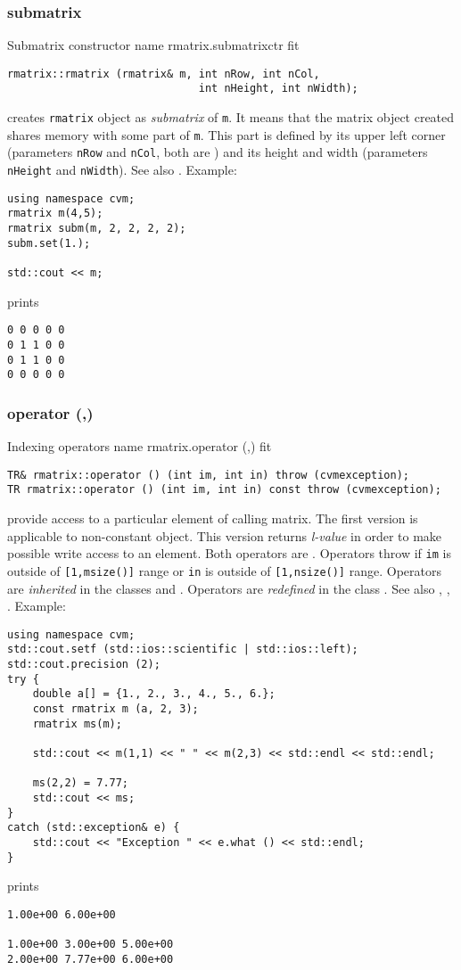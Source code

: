 \subsubsection{submatrix}
Submatrix constructor%
\pdfdest name {rmatrix.submatrixctr} fit
\begin{verbatim}
rmatrix::rmatrix (rmatrix& m, int nRow, int nCol,
                              int nHeight, int nWidth);
\end{verbatim}
creates  \verb"rmatrix" object as  \emph{submatrix} of \verb"m".
It means that the matrix object created shares  memory with some part
of \verb"m". This part is defined by its upper left corner (parameters
\verb"nRow" and \verb"nCol", both are \Based)
and its height and width (parameters
\verb"nHeight" and \verb"nWidth").
See also .
Example:
\begin{Verbatim}
using namespace cvm;
rmatrix m(4,5);
rmatrix subm(m, 2, 2, 2, 2);
subm.set(1.);

std::cout << m;
\end{Verbatim}
prints
\begin{Verbatim}
0 0 0 0 0
0 1 1 0 0
0 1 1 0 0
0 0 0 0 0
\end{Verbatim}
\newpage


\subsubsection{operator (,)}
Indexing operators%
\pdfdest name {rmatrix.operator (,)} fit
\begin{verbatim}
TR& rmatrix::operator () (int im, int in) throw (cvmexception);
TR rmatrix::operator () (int im, int in) const throw (cvmexception);
\end{verbatim}
provide access to a particular element of calling matrix. The first version
is applicable to  non-constant object.
This version returns  \emph{l-value}
in order to make possible write access to an element.
Both operators are \Based.
Operators throw 
if \verb"im" is outside of \verb"[1,msize()]" range or
\verb"in" is outside of \verb"[1,nsize()]" range.
Operators are \emph{inherited}
in the classes
 and .
Operators are \emph{redefined}
in the class .
See also ,
,
.
Example:
\begin{Verbatim}
using namespace cvm;
std::cout.setf (std::ios::scientific | std::ios::left);
std::cout.precision (2);
try {
    double a[] = {1., 2., 3., 4., 5., 6.};
    const rmatrix m (a, 2, 3);
    rmatrix ms(m);

    std::cout << m(1,1) << " " << m(2,3) << std::endl << std::endl;

    ms(2,2) = 7.77;
    std::cout << ms;
}
catch (std::exception& e) {
    std::cout << "Exception " << e.what () << std::endl;
}
\end{Verbatim}
prints
\begin{Verbatim}
1.00e+00 6.00e+00

1.00e+00 3.00e+00 5.00e+00
2.00e+00 7.77e+00 6.00e+00
\end{Verbatim}
\newpage



